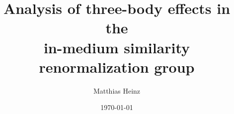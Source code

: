 \documentclass[12pt]{memoir}
\title{Analysis of three-body effects in the \\ in-medium similarity renormalization group}
\author{Matthias Heinz}
\date{\today}
\begin{document}
\frontmatter{}



\cleardoublepage

\cleardoublepage

\cleardoublepage




\cleardoublepage\tableofcontents

\cleardoublepage\listoftables

\cleardoublepage\listoffigures



\mainmatter{}















\begin{appendices}

  
  
  

\end{appendices}

\backmatter{}


\end{document}

